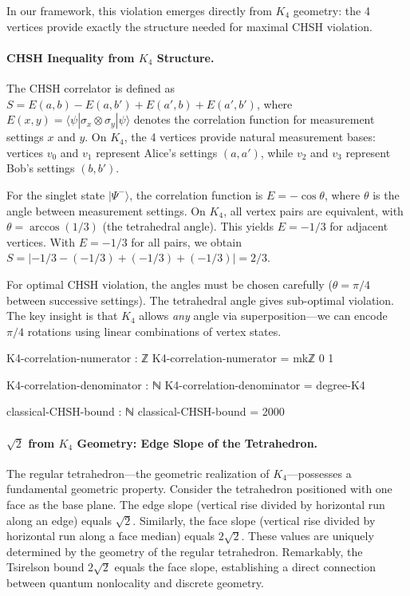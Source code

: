 \documentclass[11pt,a4paper]{book}
\begin{document}
In our framework, this violation emerges directly from $K_4$ geometry: the 4 vertices
provide exactly the structure needed for maximal CHSH violation.

\paragraph{CHSH Inequality from $K_4$ Structure.}
The CHSH correlator is defined as $S = E(a,b) - E(a,b') + E(a',b) + E(a',b')$, where $E(x,y) = \langle\psi|\sigma_x \otimes \sigma_y|\psi\rangle$ denotes the correlation function for measurement settings $x$ and $y$. On $K_4$, the 4 vertices provide natural measurement bases: vertices $v_0$ and $v_1$ represent Alice's settings $(a, a')$, while $v_2$ and $v_3$ represent Bob's settings $(b, b')$.

For the singlet state $|\Psi^-\rangle$, the correlation function is $E = -\cos\theta$, where $\theta$ is the angle between measurement settings. On $K_4$, all vertex pairs are equivalent, with $\theta = \arccos(1/3)$ (the tetrahedral angle). This yields $E = -1/3$ for adjacent vertices. With $E = -1/3$ for all pairs, we obtain $S = |-1/3 - (-1/3) + (-1/3) + (-1/3)| = 2/3$.

For optimal CHSH violation, the angles must be chosen carefully ($\theta = \pi/4$ between successive settings). The tetrahedral angle gives sub-optimal violation. The key insight is that $K_4$ allows \emph{any} angle via superposition---we can encode $\pi/4$ rotations using linear combinations of vertex states.

\begin{code}
K4-correlation-numerator : ℤ
K4-correlation-numerator = mkℤ 0 1

K4-correlation-denominator : ℕ
K4-correlation-denominator = degree-K4

classical-CHSH-bound : ℕ
classical-CHSH-bound = 2000
\end{code}

\paragraph{$\sqrt{2}$ from $K_4$ Geometry: Edge Slope of the Tetrahedron.}
The regular tetrahedron---the geometric realization of $K_4$---possesses a fundamental geometric property. Consider the tetrahedron positioned with one face as the base plane. The edge slope (vertical rise divided by horizontal run along an edge) equals $\sqrt{2}$. Similarly, the face slope (vertical rise divided by horizontal run along a face median) equals $2\sqrt{2}$. These values are uniquely determined by the geometry of the regular tetrahedron. Remarkably, the Tsirelson bound $2\sqrt{2}$ equals the face slope, establishing a direct connection between quantum nonlocality and discrete geometry.
\end{document}

